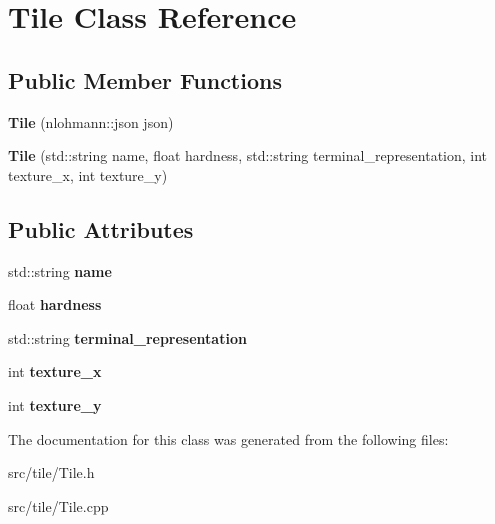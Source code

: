 \hypertarget{classTile}{\section{Tile Class Reference}
\label{classTile}
}
\subsection*{Public Member Functions}
\begin{DoxyCompactItemize}
\item 
\hypertarget{classTile_a135790fef385f3021dccf9dde464432c}{{\bfseries Tile} (nlohmann\-::json json)}\label{classTile_a135790fef385f3021dccf9dde464432c}

\item 
\hypertarget{classTile_a90a811c18a411dda0c4add4567fba857}{{\bfseries Tile} (std\-::string name, float hardness, std\-::string terminal\-\_\-representation, int texture\-\_\-x, int texture\-\_\-y)}\label{classTile_a90a811c18a411dda0c4add4567fba857}

\end{DoxyCompactItemize}
\subsection*{Public Attributes}
\begin{DoxyCompactItemize}
\item 
\hypertarget{classTile_aa5408d0f0f4a60f25796f651db2f84ac}{std\-::string {\bfseries name}}\label{classTile_aa5408d0f0f4a60f25796f651db2f84ac}

\item 
\hypertarget{classTile_accd68364f51cf745c5c95717a164b2e9}{float {\bfseries hardness}}\label{classTile_accd68364f51cf745c5c95717a164b2e9}

\item 
\hypertarget{classTile_a4792f343c63f2b7c1bf1a7321ba60206}{std\-::string {\bfseries terminal\-\_\-representation}}\label{classTile_a4792f343c63f2b7c1bf1a7321ba60206}

\item 
\hypertarget{classTile_ac1b8010b027d438ee826af235dc00fe1}{int {\bfseries texture\-\_\-x}}\label{classTile_ac1b8010b027d438ee826af235dc00fe1}

\item 
\hypertarget{classTile_addde9f80a365eae65b1f4bc156f18722}{int {\bfseries texture\-\_\-y}}\label{classTile_addde9f80a365eae65b1f4bc156f18722}

\end{DoxyCompactItemize}


The documentation for this class was generated from the following files\-:\begin{DoxyCompactItemize}
\item 
src/tile/Tile.\-h\item 
src/tile/Tile.\-cpp\end{DoxyCompactItemize}
